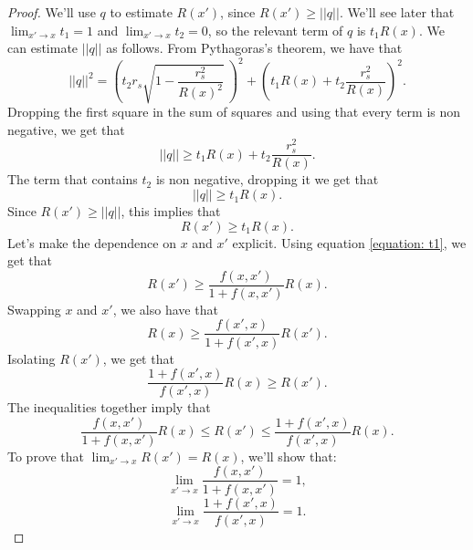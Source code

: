 \documentclass[10pt,a4paper]{amsart}
\begin{document}
\begin{proof}
	We'll use $q$ to estimate $R(x')$, since $R(x') \geq ||q||$. We'll see later that $\lim_{x' \to x} t_1 = 1$ and $\lim_{x' \to x} t_2 = 0$, so the relevant term of $q$ is $t_1 R(x)$. We can estimate $||q||$ as follows. From Pythagoras's theorem, we have that
	\begin{equation}
		||q||^2 = \left( t_2 r_s \sqrt{1 - \frac{r_s^2}{R(x)^2}} \ \right)^2 + \left( t_1 R(x) + t_2 \frac{r_s^2}{R(x)} \right)^2.
	\end{equation}
	Dropping the first square in the sum of squares and using that every term is non negative, we get that
	\begin{equation}
		||q|| \geq t_1 R(x) + t_2 \frac{r_s^2}{R(x)}.
	\end{equation}
	The term that contains $t_2$ is non negative, dropping it we get that
	\begin{equation}
		||q|| \geq t_1 R(x).
	\end{equation}
	Since $R(x') \geq ||q||$, this implies that
	\begin{equation}
		R(x') \geq t_1 R(x).
	\end{equation}
	Let's make the dependence on $x$ and $x'$ explicit. Using equation \ref{equation: t1}, we get that
	\begin{equation}
		R(x') \geq \frac{f(x,x')}{1+f(x,x')} R(x).
	\end{equation}
	Swapping $x$ and $x'$, we also have that
	\begin{equation}
		R(x) \geq \frac{f(x',x)}{1+f(x',x)} R(x').
	\end{equation}
	Isolating $R(x')$, we get that
	\begin{equation}
		\frac{1+f(x',x)}{f(x',x)} R(x) \geq R(x').
	\end{equation}
	The inequalities together imply that
	\begin{equation}
		\label{equation: R(x') bounds}
		\frac{f(x,x')}{1+f(x,x')} R(x) \leq R(x') \leq \frac{1+f(x',x)}{f(x',x)} R(x).
	\end{equation}
	To prove that $\lim_{x' \to x} R(x') = R(x)$, we'll show that:
	\begin{equation}
		\lim_{x' \to x} \frac{f(x,x')}{1+f(x,x')} = 1,
	\end{equation}
	\begin{equation}
		\lim_{x' \to x} \frac{1+f(x',x)}{f(x',x)} = 1.
	\end{equation}
	

\end{proof}
\end{document}
